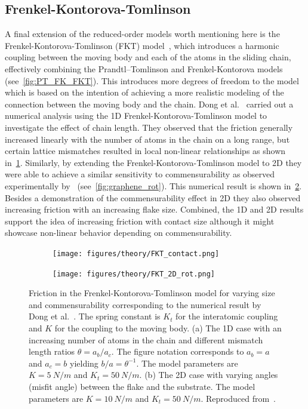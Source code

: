 \subsection{Frenkel-Kontorova-Tomlinson}
A final extension of the reduced-order models worth mentioning here is the
Frenkel-Kontorova-Tomlinson (\acrshort{FKT}) model~\cite{weiss_dry_1997}, which
introduces a harmonic coupling between the moving body and each of the atoms in the sliding chain, effectively combining the Prandtl–Tomlinson and Frenkel-Kontorova models
(see~\cref{fig:PT_FK_FKT}). This introduces more degrees of freedom to the model
which is based on the intention of achieving a more realistic modeling of the connection between the moving body and the chain. Dong et al.~\cite{Yalin_2011} carried out a numerical analysis
using the 1D Frenkel-Kontorova-Tomlinson model to investigate the effect of
chain length. They observed that the friction generally increased linearly with the number
of atoms in the chain on a long range, but certain lattice mismatches resulted in
local non-linear relationships as shown in~\cref{fig:FKT_contact}. Similarly, by
extending the Frenkel-Kontorova-Tomlinson model to 2D they were able to achieve
a similar sensitivity to commensurability as observed experimentally
by~\cite{DIENWIEBEL2005197} (see~\cref{fig:graphene_rot}). This numerical result is shown in~\cref{fig:FKT_2D_rot}. Besides a demonstration of the
commensurability effect in 2D they also observed increasing friction with an
increasing flake size. Combined, the 1D and 2D results support the idea of
increasing friction with contact size although it might showcase non-linear
behavior depending on commensurability.


\begin{figure}[!htb]
  \centering
  \begin{subfigure}[t]{0.49\textwidth}
      \centering
      \texttt{[image: figures/theory/FKT\_contact.png]}
      \caption{}
      \label{fig:FKT_contact}
    \end{subfigure}
    \hfill
    \begin{subfigure}[t]{0.49\textwidth}
      \centering
      \texttt{[image: figures/theory/FKT\_2D\_rot.png]}
      \caption{}
      \label{fig:FKT_2D_rot}
    \end{subfigure}
    \hfill
     \caption{Friction in the Frenkel-Kontorova-Tomlinson model for varying size and commensurability corresponding to the numerical result by Dong et al.~\cite{Yalin_2011}. The spring constant is $K_t$ for the interatomic coupling and $K$ for the coupling to the moving body. (a) The 1D case with an increasing number of atoms in the chain and different mismatch length ratios $\theta = a_b / a_c$. The figure notation corresponds to $a_b = a$ and $a_c =b$ yielding $b/a = \theta^{-1}$. The model parameters are $K = \SI{5}{N/m}$ and $K_t = \SI{50}{N/m}$. (b) The 2D case with varying angles (misfit angle) between the flake and the substrate. The model parameters are $K = \SI{10}{N/m}$ and $K_t = \SI{50}{N/m}$. Reproduced from~\cite{Yalin_2011}.}
     \label{fig:FKT_size}
\end{figure}


